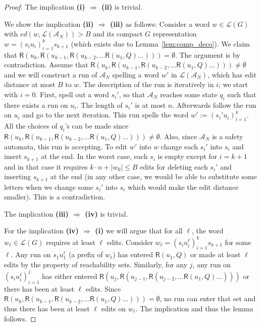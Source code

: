 \documentclass{CSML}
\newcommand{\aut}{\mathcal{A}}
\newcommand{\lang}{\mathcal{L}}
\newcommand{\R}{\textsf{R}}
\newcommand{\ed}{ed}
\begin{document}
\begin{proof}
The implication \textbf{(i) $\Rightarrow$ (ii)} is trivial.

We show the implication \textbf{(ii) $\Rightarrow$ (iii)} as follows: Consider a word $w \in \lang(G)$ with 
$\ed(w,\lang({\aut_N})) > B$ and its 
compact $G$ representation $w = (s_i u_i)_{i=1}^{k}s_{k+1}$ (which exists due to Lemma~\ref{lem:comp_deco}).
We claim that $\R(u_k, \R(u_{k-1}, \R(u_{k-2}, \ldots \R(u_1, Q) \ldots ))) = \emptyset$.
The argument is by contradiction. Assume that $\R(u_k, \R(u_{k-1}, \R(u_{k-2}, \ldots \R(u_1, Q) \ldots )))\neq \emptyset$ and we will construct a run of $\aut_N$ spelling a word $w'$ in $\lang({\aut_N})$, which has edit distance at most $B$ to $w$.
The description of the run is iteratively in $i$; we start with $i=0$.
First, spell out a word $s_i'$, so that $\aut_N$ reaches some state $q_i$ such that there exists a run on $u_i$. The length of $s_i'$ is at most $n$. Afterwards follow the run on $u_i$ and go to the next iteration. This run spells the word $w':=(s_i' u_i)_{i=1}^{k}$. All the choices of $q_i$'s can be made since $\R(u_k, \R(u_{k-1}, \R(u_{k-2}, \ldots \R(u_1, Q) \ldots )))\neq \emptyset$.
Also, since $\aut_N$ is a safety automata, this run is accepting.
To edit $w'$ into $w$ change each $s_i'$ into $s_i$ and insert $s_{k+1}$ at the end. In the worst case, each $s_i$ is empty except for $i=k+1$ and in that case it requires $k\cdot n+|w_0|\leq B$  edits for deleting each $s_i'$ and inserting $s_{k+1}$ at the end (in any other case, we would be able to substitute some letters when we change some $s_i'$ into $s_i$ which would make the edit distance smaller). This is a contradiction. 

The implication \textbf{(iii) $\Rightarrow$ (iv)} is trivial.

For the implication \textbf{(iv) $\Rightarrow$ (i)} we will argue that for all $\ell$, the word $w_\ell\in \lang(G)$ requires at least $\ell$ edits.
Consider $w_\ell=(s_i u_i^{\ell})_{i=1}^ks_{k+1}$ for some $\ell$.
Any run on $s_1 u_1^\ell$ (a prefix of $w_\ell$) has entered $\R(u_1,Q)$ or made at least $\ell$ edits by the property of reachability sets. Similarly, for any $j$, any run on $(s_i u_i^{\ell})_{i=1}^j$ has either entered $\R(u_j, \R(u_{j-1}, \R(u_{j-2}, \ldots \R(u_1, Q) \ldots )))$ or there has been at least $\ell$ edits. Since  $\R(u_k, \R(u_{k-1}, \R(u_{k-2}, \ldots \R(u_1, Q) \ldots ))) = \emptyset$, no run can enter that set and thus there has been at least $\ell$ edits on $w_\ell$. The implication and thus the lemma follows.
\end{proof}
\end{document}
